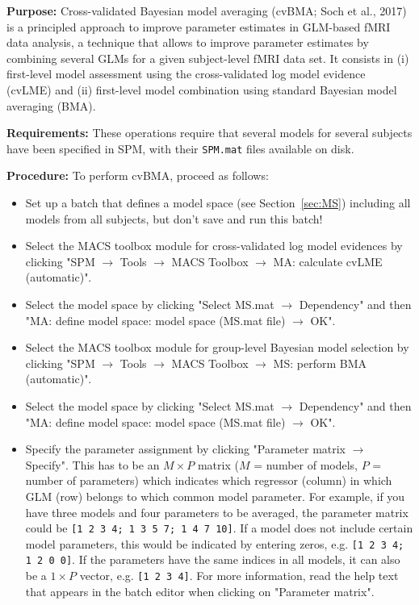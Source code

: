\documentclass[a4paper,12pt]{article}
\newcommand{\ra}{$\rightarrow$ }
\begin{document}
\textbf{Purpose:} Cross-validated Bayesian model averaging (cvBMA; Soch et al., 2017) is a principled approach to improve parameter estimates in GLM-based fMRI data analysis, a technique that allows to improve
parameter estimates by combining several GLMs for a given subject-level fMRI data set. It consists in (i) first-level model assessment using the cross-validated log model evidence (cvLME) and (ii) first-level model combination using standard Bayesian model averaging (BMA).

\textbf{Requirements:} These operations require that several models for several subjects have been specified in SPM, with their \texttt{SPM.mat} files available on disk.

\textbf{Procedure:} To perform cvBMA, proceed as follows:
\begin{itemize}
	
\item
Set up a batch that defines a model space (see Section~\ref{sec:MS}) including all models from all subjects, but don't save and run this batch!

\item
Select the MACS toolbox module for cross-validated log model evidences by clicking \linebreak[4] "SPM \ra Tools \ra MACS Toolbox \ra MA: calculate cvLME (automatic)".

\item
Select the model space by clicking "Select MS.mat \ra Dependency" and then \linebreak[4] "MA: define model space: model space (MS.mat file) \ra OK".

\item
Select the MACS toolbox module for group-level Bayesian model selection by clicking \linebreak[4] "SPM \ra Tools \ra MACS Toolbox \ra MS: perform BMA (automatic)".

\item
Select the model space by clicking "Select MS.mat \ra Dependency" and then \linebreak[4] "MA: define model space: model space (MS.mat file) \ra OK".

\item
Specify the parameter assignment by clicking "Parameter matrix \ra Specify". This has to be an $M \times P$ matrix ($M$ = number of models, $P$ = number of parameters) which indicates which regressor (column) in which GLM (row) belongs to which common model parameter. For example, if you have three models and four parameters to be averaged, the parameter matrix could be \texttt{[1 2 3 4; 1 3 5 7; 1 4 7 10]}. If a model does not include certain model parameters, this would be indicated by entering zeros, e.g. \texttt{[1 2 3 4; 1 2 0 0]}. If the parameters have the same indices in all models, it can also be a $1 \times P$ vector, e.g. \texttt{[1 2 3 4]}. For more information, read the help text that appears in the batch editor when clicking on "Parameter matrix".


\end{itemize}
\end{document}
